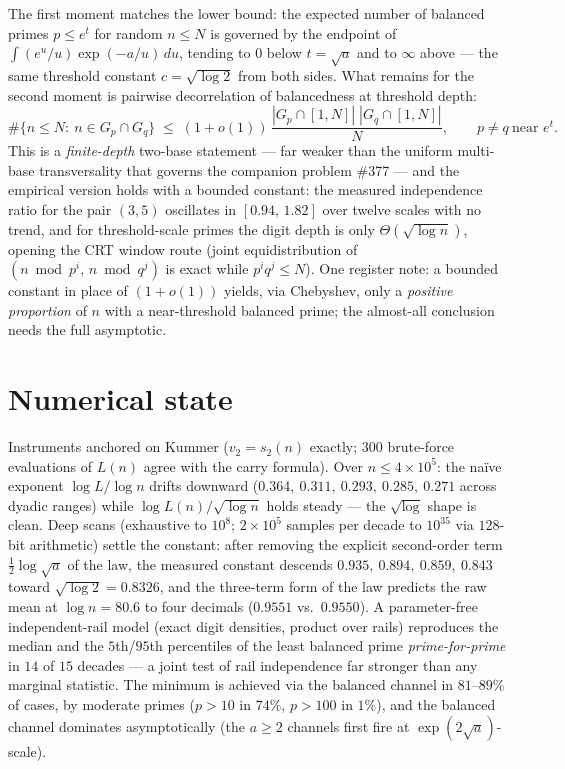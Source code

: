 \documentclass[11pt]{article}
\begin{document}
The first moment matches the lower bound: the expected number of balanced
primes $p\le e^{t}$ for random $n\le N$ is governed by the endpoint of
$\int(e^{u}/u)\exp(-a/u)\,du$, tending to $0$ below $t=\sqrt a$ and to
$\infty$ above --- the same threshold constant $c=\sqrt{\log2}$ from both
sides.  What remains for the second moment is
pairwise decorrelation of balancedness at threshold depth:
\[
\#\{n\le N:\ n\in G_p\cap G_q\}\;\le\;(1+o(1))\,
\frac{|G_p\cap[1,N]|\;|G_q\cap[1,N]|}{N},\qquad p\ne q\ \text{near }e^{t}.
\]
This is a \emph{finite-depth} two-base statement --- far weaker than the
uniform multi-base transversality that governs the companion problem
\#377 --- and the empirical version holds with a bounded constant: the
measured independence ratio for the pair $(3,5)$ oscillates in
$[0.94,\,1.82]$ over twelve scales with no trend, and for threshold-scale
primes the digit depth is only $\Theta(\sqrt{\log n})$, opening the CRT
window route (joint equidistribution of $(n\bmod p^{i},\,n\bmod q^{j})$ is
exact while $p^iq^j\le N$).  One register note: a bounded constant in place
of $(1+o(1))$ yields, via Chebyshev, only a \emph{positive proportion} of
$n$ with a near-threshold balanced prime; the almost-all conclusion needs
the full asymptotic.

\section{Numerical state}

Instruments anchored on Kummer ($v_2=s_2(n)$ exactly; $300$ brute-force
evaluations of $L(n)$ agree with the carry formula).  Over $n\le4\times10^5$:
the na\"ive exponent $\log L/\log n$ drifts downward
($0.364,\ 0.311,\ 0.293,\ 0.285,\ 0.271$ across dyadic ranges) while
$\log L(n)/\sqrt{\log n}$ holds steady --- the $\sqrt{\log}$ shape is clean.
Deep scans (exhaustive to $10^{8}$; $2\times10^{5}$ samples per decade to
$10^{35}$ via $128$-bit arithmetic) settle the constant: after removing the
explicit second-order term $\tfrac12\log\sqrt a$ of the law, the measured
constant descends $0.935,\ 0.894,\ 0.859,\ 0.843$ toward
$\sqrt{\log2}=0.8326$, and the three-term form of the law predicts the raw
mean at $\log n=80.6$ to four decimals ($0.9551$ vs.\ $0.9550$).  A
parameter-free independent-rail model (exact digit densities, product over
rails) reproduces the median and the $5$th/$95$th percentiles of the least
balanced prime \emph{prime-for-prime} in $14$ of $15$ decades --- a joint
test of rail independence far stronger than any marginal statistic.  The
minimum is achieved via the balanced channel in $81$--$89\%$ of cases, by
moderate primes ($p>10$ in $74\%$, $p>100$ in $1\%$), and the balanced
channel dominates asymptotically (the $a\ge2$ channels first fire at
$\exp(2\sqrt a)$-scale).
\end{document}
